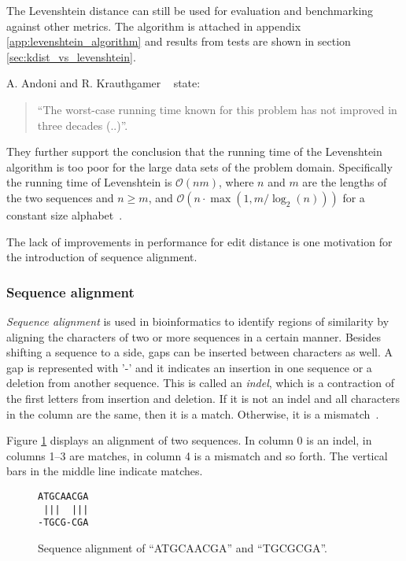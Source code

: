 The Levenshtein distance can still be used for evaluation and benchmarking
against other metrics. The algorithm is attached in appendix
\ref{app:levenshtein_algorithm} and results from tests are shown in section
\ref{sec:kdist_vs_levenshtein}.

A. Andoni and R. Krauthgamer ~\cite[pp.~1--2]{andoni} state:
\begin{quote}
  ``The worst-case running time known for this problem has not improved in
  three decades (..)''.
\end{quote}
They further support the conclusion that the running time of the Levenshtein
algorithm is too poor for the large data sets of the problem domain.
Specifically the running time of Levenshtein is $\mathcal{O}(nm)$, where $n$
and $m$ are the lengths of the two sequences and $n\geq m$, and $\mathcal{O}(n
\cdot \max{(1,m/\log_2(n))})$ for a constant size alphabet~\cite{masek}.

The lack of improvements in performance for edit distance is one motivation
for the introduction of sequence alignment.


\subsubsection{Sequence alignment}

\emph{Sequence alignment} is used in bioinformatics to identify regions of
similarity by aligning the characters of two or more sequences in a certain
manner. Besides shifting a sequence to a side, gaps can be inserted between
characters as well. A gap is represented with '-' and it indicates an insertion
in one sequence or a deletion from another sequence. This is called an
\emph{indel}, which is a contraction of the first letters from insertion and
deletion. If it is not an indel and all characters in the column are the same,
then it is a match. Otherwise, it is a mismatch~\cite[pp.~135--136]{dong}.

Figure \ref{fig:seq_alignment} displays an alignment of two sequences. In
column 0 is an indel, in columns 1--3 are matches, in column
4 is a mismatch and so forth. The vertical bars in the middle
line indicate matches.

\begin{figure}[H]
  \centering
  \verb+ATGCAACGA+ \\
  \verb+ |||  |||+ \\
  \verb+-TGCG-CGA+
  \caption{Sequence alignment of ``ATGCAACGA'' and ``TGCGCGA''.}
  \label{fig:seq_alignment}
\end{figure}

